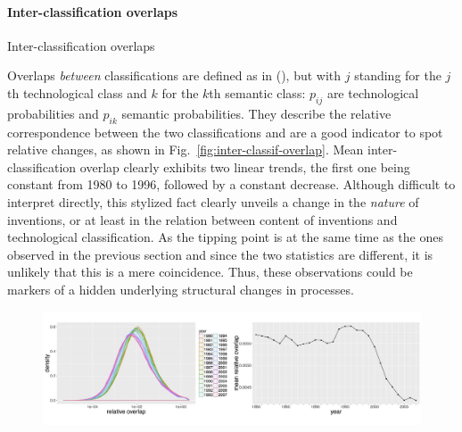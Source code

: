 \paragraph{Inter-classification overlaps}{Inter-classification overlaps}

Overlaps \emph{between} classifications are defined as in (), but with $j$ standing for the $j$th technological class and $k$ for the $k$th semantic class: $p_{ij}$ are technological probabilities and $p_{ik}$ semantic probabilities. They describe the relative correspondence between the two classifications and are a good indicator to spot relative changes, as shown in Fig.~\ref{fig:inter-classif-overlap}. Mean inter-classification overlap clearly exhibits two linear trends, the first one being constant from 1980 to 1996, followed by a constant decrease. Although difficult to interpret directly, this stylized fact clearly unveils a change in the \emph{nature} of inventions, or at least in the relation between content of inventions and technological classification. As the tipping point is at the same time as the ones observed in the previous section and since the two statistics are different, it is unlikely that this is a mere coincidence. Thus, these observations could be markers of a hidden underlying structural changes in processes. 




\begin{figure}[!ht]
\includegraphics[width=\linewidth]{Figures/Final/C-patentsmining-inter-classif-overlap.jpg}
\label{fig:patentsmining:inter-classif-overlap}
\end{figure}





